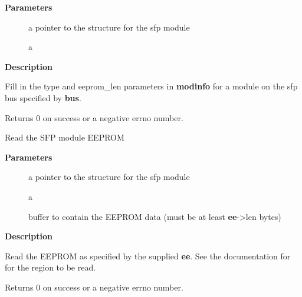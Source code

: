 \documentclass[a4paper,8pt,english]{sphinxmanual}
\begin{document}
\textbf{Parameters}
\begin{description}
\item[{}] \leavevmode
a pointer to the {\hyperref[networking/kapi:c.sfp_bus]{\emph{}}} structure for the sfp module

\item[{}] \leavevmode
a 

\end{description}

\textbf{Description}

Fill in the type and eeprom\_len parameters in \textbf{modinfo} for a module on
the sfp bus specified by \textbf{bus}.

Returns 0 on success or a negative errno number.

\begin{fulllineitems}
\label{networking/kapi:c.sfp_get_module_eeprom}
Read the SFP module EEPROM

\end{fulllineitems}


\textbf{Parameters}
\begin{description}
\item[{}] \leavevmode
a pointer to the {\hyperref[networking/kapi:c.sfp_bus]{\emph{}}} structure for the sfp module

\item[{}] \leavevmode
a 

\item[{}] \leavevmode
buffer to contain the EEPROM data (must be at least \textbf{ee}-\textgreater{}len bytes)

\end{description}

\textbf{Description}

Read the EEPROM as specified by the supplied \textbf{ee}. See the documentation
for  for the region to be read.

Returns 0 on success or a negative errno number.
\end{document}
